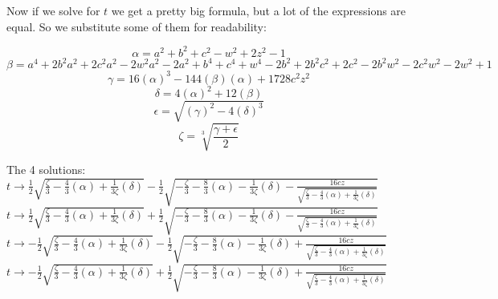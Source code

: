 \documentclass[12pt,a4paper,landscape]{amsart}
\numberwithin{equation}{section}
\theoremstyle{plain}
\theoremstyle{definition}
\begin{document}
\newpage
Now if we solve for $t$ we get a pretty big formula, but a lot of the expressions are equal. So we substitute some of them for readability:

\[\alpha = a^2+b^2+c^2-w^2+2 z^2-1\]
\[\beta = a^4+2 b^2 a^2+2 c^2 a^2-2 w^2 a^2-2 a^2+b^4+c^4+w^4-2 b^2+2 b^2 c^2+2 c^2-2 b^2 w^2-2 c^2 w^2-2 w^2+1\]
\[\gamma = 16 \left(\alpha\right)^3-144 \left(\beta\right) \left(\alpha\right)+1728 c^2 z^2\]
\[\delta = 4 \left(\alpha\right)^2+12 \left(\beta\right)\]
\[\epsilon = \sqrt{\left(\gamma\right)^2-4 \left(\delta\right)^3} \]
\[\zeta = \sqrt[3]{\frac{\gamma+\epsilon}{2}} \]

The 4 solutions:\\

$
t\to \frac{1}{2} \sqrt{\frac{\zeta}{3}-\frac{4}{3} \left(\alpha\right)+\frac{1}{3\zeta}\left(\delta\right)}-\frac{1}{2} \sqrt{-\frac{\zeta}{3}-\frac{8}{3} \left(\alpha\right)-\frac{1}{3\zeta}\left(\delta\right)-\frac{16 c z}{\sqrt{\frac{\zeta}{3}-\frac{4}{3} \left(\alpha\right)+\frac{1}{3 \zeta}\left(\delta\right)}}}
$\\

$
t\to \frac{1}{2} \sqrt{\frac{\zeta}{3}-\frac{4}{3} \left(\alpha\right)+\frac{1}{3\zeta}\left(\delta\right)}+\frac{1}{2} \sqrt{-\frac{\zeta}{3}-\frac{8}{3} \left(\alpha\right)-\frac{1}{3\zeta}\left(\delta\right)-\frac{16 c z}{\sqrt{\frac{\zeta}{3}-\frac{4}{3} \left(\alpha\right)+\frac{1}{3 \zeta}\left(\delta\right)}}}
$\\

$
t\to -\frac{1}{2} \sqrt{\frac{\zeta}{3}-\frac{4}{3} \left(\alpha\right)+\frac{1}{3\zeta}\left(\delta\right)}-\frac{1}{2} \sqrt{-\frac{\zeta}{3}-\frac{8}{3} \left(\alpha\right)-\frac{1}{3\zeta}\left(\delta\right)+\frac{16 c z}{\sqrt{\frac{\zeta}{3}-\frac{4}{3} \left(\alpha\right)+\frac{1}{3 \zeta}\left(\delta\right)}}}
$\\

$
t\to -\frac{1}{2} \sqrt{\frac{\zeta}{3}-\frac{4}{3} \left(\alpha\right)+\frac{1}{3\zeta}\left(\delta\right)}+\frac{1}{2} \sqrt{-\frac{\zeta}{3}-\frac{8}{3} \left(\alpha\right)-\frac{1}{3\zeta}\left(\delta\right)+\frac{16 c z}{\sqrt{\frac{\zeta}{3}-\frac{4}{3} \left(\alpha\right)+\frac{1}{3 \zeta}\left(\delta\right)}}}
$\\
\end{document}
